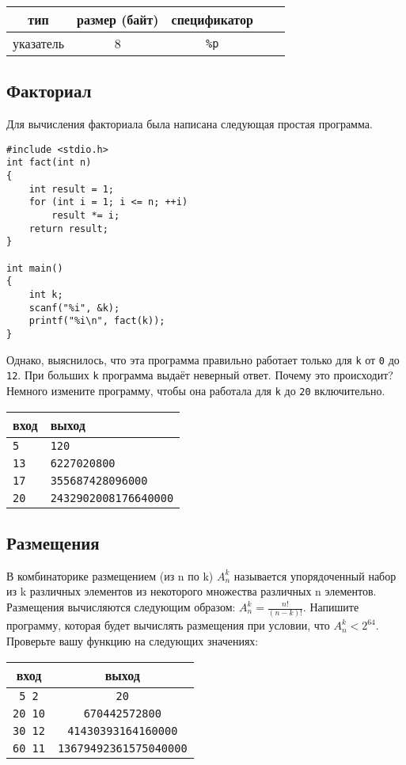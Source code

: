 \documentclass{article}
\begin{document}
\begin{center}
\begin{tabular}{ c c c c c }
 тип & размер (байт)  & спецификатор \\ \hline
 указатель             & 8           & \texttt{\%p} \\ 
\end{tabular}
\end{center}

\subsection{Факториал}
Для вычисления факториала была написана следующая простая программа. 
\begin{lstlisting}
#include <stdio.h>
int fact(int n) 
{
    int result = 1;
    for (int i = 1; i <= n; ++i)
        result *= i;
    return result;
}

int main() 
{
    int k;
    scanf("%i", &k);
    printf("%i\n", fact(k));
}
\end{lstlisting}
Однако, выяснилось, что эта программа правильно работает только для \texttt{k} от \texttt{0} до \texttt{12}. При больших \texttt{k} программа выдаёт неверный ответ. Почему это происходит?
Немного измените программу, чтобы она работала для \texttt{k} до \texttt{20} включительно.

\begin{center}
\begin{tabular}{ l l }
 вход & выход \\ \hline
 \texttt{5} & \texttt{120}  \\ 
 \texttt{13} & \texttt{6227020800} \\
 \texttt{17} & \texttt{355687428096000} \\
 \texttt{20} & \texttt{2432902008176640000} \\
\end{tabular}
\end{center}


\subsection{Размещения}
В комбинаторике размещением (из n по k) $A_n^k$ называется упорядоченный набор из k различных элементов из некоторого множества различных n элементов. Размещения вычисляются следующим образом: $A_n^k = \frac{n!}{(n-k)!}$. Напишите программу, которая будет вычислять размещения при условии, что  $A_n^k < 2^{64}$. Проверьте вашу функцию на следующих значениях:
\begin{center}
\begin{tabular}{ c c }
 вход & выход \\ \hline
 \texttt{5 2} & \texttt{20}  \\ 
 \texttt{20 10} & \texttt{670442572800}  \\ 
 \texttt{30 12} & \texttt{41430393164160000} \\ 
 \texttt{60 11} & \texttt{13679492361575040000} \\   
\end{tabular}
\end{center}
\end{document}
